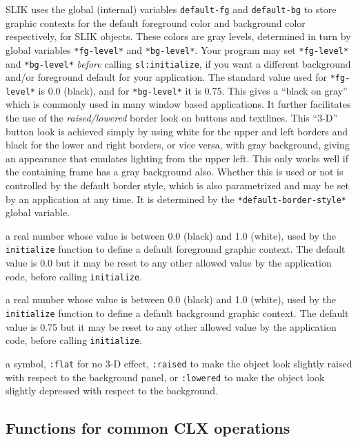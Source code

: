 \documentclass[twoside,openright,11pt]{report}
\newcommand{\tp}[1]{\texttt{#1}}
\begin{document}
SLIK uses the global (internal) variables \tp{default-fg} and
\tp{default-bg} to store graphic contexts for the default foreground
color and background color respectively, for SLIK objects.  These
colors are gray levels, determined in turn by global variables
\tp{*fg-level*} and \tp{*bg-level*}.  Your program may set
\tp{*fg-level*} and \tp{*bg-level*} \emph{before} calling
\tp{sl:initialize}, if you want a different background and/or
foreground default for your application.  The standard value used for
\tp{*fg-level*} is 0.0 (black), and for \tp{*bg-level*} it is 0.75.
This gives a ``black on gray'' which is commonly used in many window
based applications.  It further facilitates the use of the
\emph{raised/lowered} border look on buttons and textlines.  This
``3-D'' button look is achieved simply by using white for the upper
and left borders and black for the lower and right borders, or vice
versa, with gray background, giving an appearance that emulates
lighting from the upper left.  This only works well if the containing
frame has a gray background also.  Whether this is used or not is
controlled by the default border style, which is also parametrized and
may be set by an application at any time.  It is determined by the
\tp{*default-border-style*} global variable.

{a real number whose value is between 0.0 (black) and 1.0 (white),
used by the \tp{initialize} function to define a default foreground
graphic context.  The default value is 0.0 but it may be reset to any
other allowed value by the application code, before calling
\tp{initialize}.}

{a real number whose value is between 0.0 (black) and 1.0 (white),
used by the \tp{initialize} function to define a default background
graphic context.  The default value is 0.75 but it may be reset to any
other allowed value by the application code, before calling
\tp{initialize}.}

{a symbol, \tp{:flat} for no 3-D effect, \tp{:raised} to make the
object look slightly raised with respect to the background panel, or
\tp{:lowered} to make the object look slightly depressed with respect
to the background.}

\subsection{Functions for common CLX operations}
\end{document}
